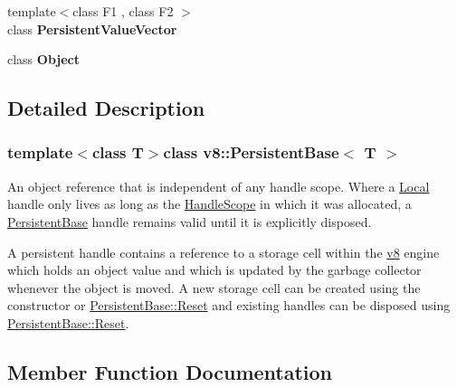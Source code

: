 \begin{DoxyCompactItemize}
\item 
\hypertarget{classv8_1_1PersistentBase_a978bb1377559897d74d5fe883a54a315}{}{\footnotesize template$<$class F1 , class F2 $>$ }\\class {\bfseries Persistent\+Value\+Vector}\label{classv8_1_1PersistentBase_a978bb1377559897d74d5fe883a54a315}

\item 
\hypertarget{classv8_1_1PersistentBase_a0720b5f434e636e22a3ed34f847eec57}{}class {\bfseries Object}\label{classv8_1_1PersistentBase_a0720b5f434e636e22a3ed34f847eec57}

\end{DoxyCompactItemize}


\subsection{Detailed Description}
\subsubsection*{template$<$class T$>$class v8\+::\+Persistent\+Base$<$ T $>$}

An object reference that is independent of any handle scope. Where a \hyperlink{classv8_1_1Local}{Local} handle only lives as long as the \hyperlink{classv8_1_1HandleScope}{Handle\+Scope} in which it was allocated, a \hyperlink{classv8_1_1PersistentBase}{Persistent\+Base} handle remains valid until it is explicitly disposed.

A persistent handle contains a reference to a storage cell within the \hyperlink{namespacev8}{v8} engine which holds an object value and which is updated by the garbage collector whenever the object is moved. A new storage cell can be created using the constructor or \hyperlink{classv8_1_1PersistentBase_a174bb1e45b18fd4eeaee033622825bb8}{Persistent\+Base\+::\+Reset} and existing handles can be disposed using \hyperlink{classv8_1_1PersistentBase_a174bb1e45b18fd4eeaee033622825bb8}{Persistent\+Base\+::\+Reset}. 

\subsection{Member Function Documentation}
\hypertarget{classv8_1_1PersistentBase_a4a64c26d91ed6a276aa8a7ca4bb7683a}{}
